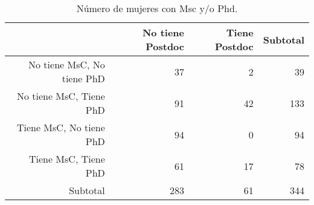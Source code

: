 \begin{table}[ht]
\centering
\begin{tabular}{rrrr}
  \hline
 & No tiene Postdoc & Tiene Postdoc & Subtotal \\ 
  \hline
No tiene MsC, No tiene PhD & 37 & 2 & 39 \\ 
  No tiene MsC, Tiene PhD & 91 & 42 & 133 \\ 
  Tiene MsC, No tiene PhD & 94 & 0 & 94 \\ 
  Tiene MsC, Tiene PhD & 61 & 17 & 78 \\ 
  Subtotal & 283 & 61 & 344 \\ 
   \hline
\end{tabular}
\caption{Número de mujeres con Msc y/o Phd.} 
\label{tab:countwomen}
\end{table}
